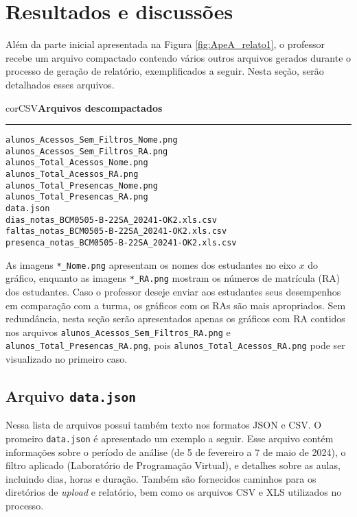 \section{Resultados e discussões}\label{sec:apendice_resultados}

Além da parte inicial apresentada na Figura \ref{fig:ApeA_relato1}, o professor recebe um arquivo compactado contendo vários outros arquivos gerados durante o processo de geração de relatório, exemplificados a seguir. Nesta seção, serão detalhados esses arquivos.

\begin{myboxCode}{corCSV}{\textbf{Arquivos descompactados}}\vspace{3mm}
\hrule
\begin{verbatim}
alunos_Acessos_Sem_Filtros_Nome.png
alunos_Acessos_Sem_Filtros_RA.png
alunos_Total_Acessos_Nome.png
alunos_Total_Acessos_RA.png
alunos_Total_Presencas_Nome.png
alunos_Total_Presencas_RA.png
data.json
dias_notas_BCM0505-B-22SA_20241-OK2.xls.csv
faltas_notas_BCM0505-B-22SA_20241-OK2.xls.csv
presenca_notas_BCM0505-B-22SA_20241-OK2.xls.csv
\end{verbatim}
\end{myboxCode}

As imagens \verb|*_Nome.png| apresentam os nomes dos estudantes no eixo $x$ do gráfico, enquanto as imagens \verb|*_RA.png| mostram os números de matrícula (RA) dos estudantes. Caso o professor deseje enviar aos estudantes seus desempenhos em comparação com a turma, os gráficos com os RAs são mais apropriados. Sem redundância, nesta seção serão apresentados apenas os gráficos com RA contidos nos arquivos \verb|alunos_Acessos_Sem_Filtros_RA.png| e \verb|alunos_Total_Presencas_RA.png|, pois \verb|alunos_Total_Acessos_RA.png| pode ser visualizado no primeiro caso.

\subsection{Arquivo \texttt{data.json}}

Nessa lista de arquivos possui também texto nos formatos JSON e CSV. O promeiro \verb|data.json| é apresentado um exemplo a seguir. Esse arquivo contém informações sobre o período de análise (de 5 de fevereiro a 7 de maio de 2024), o filtro aplicado (Laboratório de Programação Virtual), e detalhes sobre as aulas, incluindo dias, horas e duração. Também são fornecidos caminhos para os diretórios de \textit{upload} e relatório, bem como os arquivos CSV e XLS utilizados no processo.



